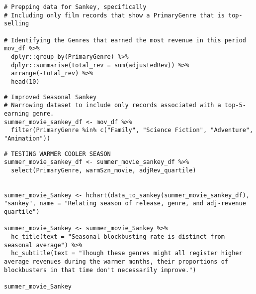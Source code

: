 \begin{lstlisting}
# Prepping data for Sankey, specifically
# Including only film records that show a PrimaryGenre that is top-selling

# Identifying the Genres that earned the most revenue in this period
mov_df %>%
  dplyr::group_by(PrimaryGenre) %>%
  dplyr::summarise(total_rev = sum(adjustedRev)) %>%
  arrange(-total_rev) %>%
  head(10)
\end{lstlisting}

\begin{lstlisting}
# Improved Seasonal Sankey
# Narrowing dataset to include only records associated with a top-5-earning genre.
summer_movie_sankey_df <- mov_df %>%
  filter(PrimaryGenre %in% c("Family", "Science Fiction", "Adventure", "Animation"))
\end{lstlisting}

\begin{lstlisting}
# TESTING WARMER COOLER SEASON
summer_movie_sankey_df <- summer_movie_sankey_df %>%
  select(PrimaryGenre, warmSzn_movie, adjRev_quartile)


summer_movie_Sankey <- hchart(data_to_sankey(summer_movie_sankey_df), "sankey", name = "Relating season of release, genre, and adj-revenue quartile")

summer_movie_Sankey <- summer_movie_Sankey %>%
  hc_title(text = "Seasonal blockbusting rate is distinct from seasonal average") %>%
  hc_subtitle(text = "Though these genres might all register higher average revenues during the warmer months, their proportions of blockbusters in that time don't necessarily improve.")

summer_movie_Sankey
\end{lstlisting}

